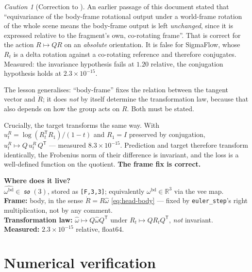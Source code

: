 \documentclass[11pt,a4paper]{report}
\theoremstyle{definition}
\theoremstyle{remark}
\newtheorem{caution}[caution]{Caution}
\DeclareMathOperator{\so}{\mathfrak{so}}
\newcommand{\RR}{\mathbb R}
\newcommand{\pyfunc}[1]{\texttt{#1}}
\newcommand{\shape}[1]{\texttt{[#1]}}
\begin{document}
\begin{caution}[Correction to ]
\label{caution:head-correction}
An earlier passage of this document stated that ``equivariance of the
body-frame rotational output under a world-frame rotation of the whole scene
means the body-frame output is left \emph{unchanged}, since it is expressed
relative to the fragment's own, co-rotating frame''. That is correct for the
action $R\mapsto QR$ on an \emph{absolute} orientation. It is false for
SigmaFlow, whose $R_t$ is a delta rotation against a co-rotating reference
and therefore conjugates. Measured: the invariance hypothesis fails at
$1.20$ relative, the conjugation hypothesis holds at $2.3\times10^{-15}$.

The lesson generalises: ``body-frame'' fixes the relation between the tangent
vector and $\dot R$; it does \emph{not} by itself determine the
transformation law, because that also depends on how the group acts on $R$.
Both must be stated.
\end{caution}

Crucially, the target transforms the same way. With
$u_t^R=\log(R_t^{\mathsf T}R_1)/(1-t)$ and $R_1=I$ preserved by conjugation,
$u_t^R\mapsto Q\,u_t^R\,Q^{\mathsf T}$ --- measured $8.3\times10^{-15}$.
Prediction and target therefore transform identically, the Frobenius norm of
their difference is invariant, and the loss is a well-defined function on the
quotient. \textbf{The frame fix is correct.}

\begin{codebox}
\textbf{Where does it live?} \\
$\widehat{\omega^{\mathrm{bd}}}\in\so(3)$, stored as \shape{F,3,3};
equivalently $\omega^{\mathrm{bd}}\in\RR^3$ via the vee map. \\
\textbf{Frame:} body, in the sense $\dot R=R\widehat\omega$
\eqref{eq:head-body} --- fixed by \pyfunc{euler\_step}'s right
multiplication, not by any comment. \\
\textbf{Transformation law:}
$\widehat\omega\mapsto Q\widehat\omega Q^{\mathsf T}$ under
$R_t\mapsto QR_tQ^{\mathsf T}$, \emph{not} invariant. \\
\textbf{Measured:} $2.3\times10^{-15}$ relative, float64.
\end{codebox}

\section{Numerical verification}
\label{sec:head-numerics}
\end{document}
